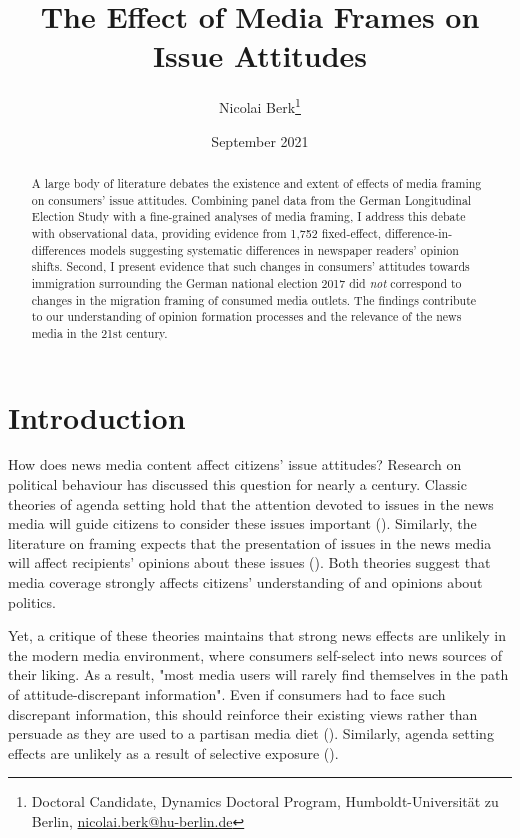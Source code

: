 \documentclass{article}
\title{The Effect of Media Frames on Issue Attitudes}
\author{Nicolai Berk\footnote{Doctoral Candidate, Dynamics Doctoral Program, Humboldt-Universität zu Berlin, \href{mailto:nicolai.berk@hu-berlin.de}{nicolai.berk@hu-berlin.de}}}
\date{September 2021}
\begin{document}
\maketitle


\begin{abstract}
    A large body of literature debates the existence and extent of effects of media framing on consumers' issue attitudes. Combining panel data from the German Longitudinal Election Study with a fine-grained analyses of media framing, I address this debate with observational data, providing evidence from 1,752 fixed-effect, difference-in-differences models suggesting systematic differences in newspaper readers' opinion shifts. Second, I present evidence that such changes in consumers' attitudes towards immigration surrounding the German national election 2017 did \textit{not} correspond to changes in the migration framing of consumed media outlets. The findings contribute to our understanding of opinion formation processes and the relevance of the news media in the 21st century.
\end{abstract}


\section{Introduction}


How does news media content affect citizens' issue attitudes? Research on political behaviour has discussed this question for nearly a century. Classic theories of agenda setting hold that the attention devoted to issues in the news media will guide citizens to consider these issues important (\cite{McCombs1972}). Similarly, the literature on framing expects that the presentation of issues in the news media will affect recipients' opinions about these issues (\cite{Nelson1997}). Both theories suggest that media coverage strongly affects citizens' understanding of and opinions about politics.

Yet, a critique of these theories maintains that strong news effects are unlikely in the modern media environment, where consumers self-select into news sources of their liking. As a result, "most media users will rarely find themselves in the path of attitude-discrepant information". Even if consumers had to face such discrepant information, this should reinforce their existing views rather than persuade as they are used to a partisan media diet (\cite[724f]{Bennett2008}). Similarly, agenda setting effects are unlikely as a result of selective exposure (\cite{Lau2021}).
\end{document}
